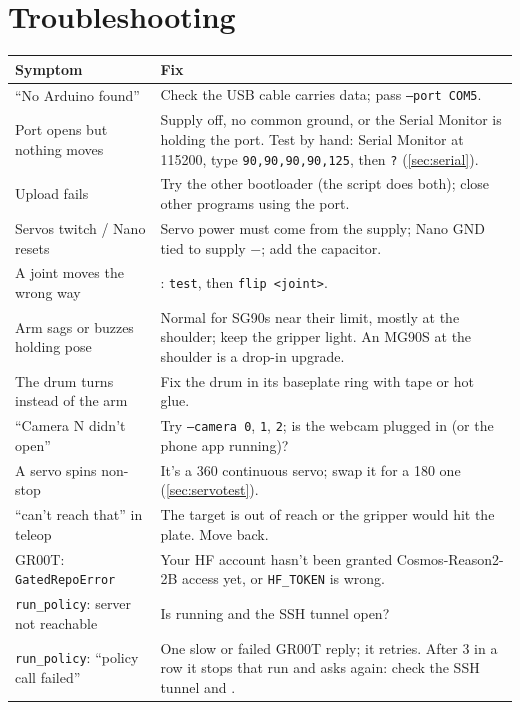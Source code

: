 \documentclass[11pt]{article}
\newcommand{\file}[1]{\texttt{\detokenize{#1}}}
\begin{document}
\section{Troubleshooting}

\begin{table}[H]
\centering\small
\begin{tabularx}{\linewidth}{@{}p{4.6cm}X@{}}
\toprule
Symptom & Fix \\
\midrule
``No Arduino found'' & Check the USB cable carries data; pass \texttt{--port COM5}. \\
Port opens but nothing moves & Supply off, no common ground, or the Serial Monitor is holding the port. Test by hand: Serial Monitor at 115200, type \texttt{90,90,90,90,125}, then \texttt{?} (\cref{sec:serial}). \\
Upload fails & Try the other bootloader (the script does both); close other programs using the port. \\
Servos twitch / Nano resets & Servo power must come from the supply; Nano GND tied to supply $-$; add the capacitor. \\
A joint moves the wrong way & \file{calibrate.py}: \texttt{test}, then \texttt{flip <joint>}. \\
Arm sags or buzzes holding pose & Normal for SG90s near their limit, mostly at the shoulder; keep the gripper light. An MG90S at the shoulder is a drop-in upgrade. \\
The drum turns instead of the arm & Fix the drum in its baseplate ring with tape or hot glue. \\
``Camera N didn't open'' & Try \texttt{--camera 0}, \texttt{1}, \texttt{2}; is the webcam plugged in (or the phone app running)? \\
A servo spins non-stop & It's a 360\textdegree{} continuous servo; swap it for a 180\textdegree{} one (\cref{sec:servotest}). \\
``can't reach that'' in teleop & The target is out of reach or the gripper would hit the plate. Move back. \\
GR00T: \texttt{GatedRepoError} & Your HF account hasn't been granted Cosmos-Reason2-2B access yet, or \texttt{HF\_TOKEN} is wrong. \\
\texttt{run\_policy}: server not reachable & Is \file{serve.sh} running and the SSH tunnel open? \\
\texttt{run\_policy}: ``policy call failed'' & One slow or failed GR00T reply; it retries. After 3 in a row it stops that run and asks again: check the SSH tunnel and \file{serve.sh}. \\

\end{tabularx}
\end{table}
\end{document}
